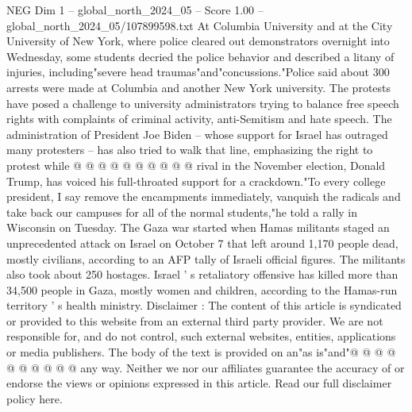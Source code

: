\begin{textsample}{NEG Dim 1 – global\_north\_2024\_05 – Score 1.00 – global\_north\_2024\_05/107899598.txt}
At Columbia University and at the City University of New York, where police cleared out demonstrators overnight into Wednesday, some students decried the police behavior and described a litany of injuries, including"severe head traumas"and"concussions."Police said about 300 arrests were made at Columbia and another New York university.
The protests have posed a challenge to university administrators trying to balance free speech rights with complaints of criminal activity, anti-Semitism and hate speech.
The administration of President Joe Biden -- whose support for Israel has outraged many protesters -- has also tried to walk that line, emphasizing the right to protest while @ @ @ @ @ @ @ @ @ @ rival in the November election, Donald Trump, has voiced his full-throated support for a crackdown."To every college president, I say remove the encampments immediately, vanquish the radicals and take back our campuses for all of the normal students,"he told a rally in Wisconsin on Tuesday.
The Gaza war started when Hamas militants staged an unprecedented attack on Israel on October 7 that left around 1,170 people dead, mostly civilians, according to an AFP tally of Israeli official figures.
The militants also took about 250 hostages.
Israel ' s retaliatory offensive has killed more than 34,500 people in Gaza, mostly women and children, according to the Hamas-run territory ' s health ministry.
Disclaimer : The content of this article is syndicated or provided to this website from an external third party provider.
We are not responsible for, and do not control, such external websites, entities, applications or media publishers.
The body of the text is provided on an"as is"and"@ @ @ @ @ @ @ @ @ @ any way.
Neither we nor our affiliates guarantee the accuracy of or endorse the views or opinions expressed in this article.
Read our full disclaimer policy here.

\end{textsample}
